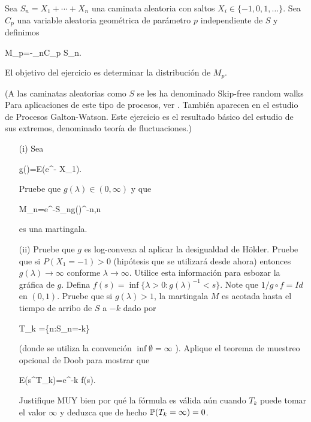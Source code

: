 \begin{problema}
		Sea $S_n=X_1+\cdots+X_n$ una caminata aleatoria con saltos $X_i\in \{-1,0,1,\ldots\}$. 
		Sea \(C_p\) una variable aleatoria geom\'etrica de par\'ametro $p$ independiente de \(S\) y definimos 
		
		\begin{esn}
			M_p=-\min_{n\leq C_p} S_n. 
		\end{esn}
		
		El objetivo del ejercicio es determinar la distribuci\'on de $M_p$.

		(A las caminatas aleatorias como $S$ se les ha denominado Skip-free random walks Para aplicaciones de este tipo 
		de procesos, ver \cite{MR1978607}. Tambi\'en aparecen en el estudio de Procesos Galton-Watson. 
		Este ejercicio es el resultado b\'asico del estudio de sus extremos, denominado teor\'ia de fluctuaciones.)

	\begin{enumerate}
		
		\item[(i)] 	
					Sea
					\begin{esn}
						g(\lambda)=E(e^{- \lambda X_1}).
					\end{esn} 
					Pruebe que $g(\lambda)\in (0,\infty)$ y que
					\begin{esn}
						M_n=e^{-\lambda S_n}g(\lambda)^{-n},n\geq 0
					\end{esn}
					es una martingala.
		\item[(ii)] 
					Pruebe que $g$ es log-convexa al aplicar la desigualdad de H\"older. Pruebe que si $P(X_1=-1)>0$ (hip\'otesis que se utilizar\'a desde ahora) 
					entonces $g(\lambda)\to\infty$ conforme $\lambda\to\infty$. Utilice esta informaci\'on para esbozar la gr\'afica de $g$. 
					Defina $ f(s)=\inf \{ \lambda>0:g(\lambda)^{-1} < s\} $. Note que $1/g\circ f=Id$ en $(0,1)$. Pruebe que si $g(\lambda)>1$, 
					la martingala $M$ es acotada hasta el tiempo de arribo de $S$ a $-k$ dado por 
					\begin{esn}
						T_k =\min \{n\in\na:S_n=-k\} 
					\end{esn}
					(donde se utiliza la convenci\'on $\inf\emptyset=\infty$ ). Aplique el teorema de muestreo opcional de Doob para mostrar que 
					\begin{esn}
						E(s^{T_k})=e^{-k f(s)}.
					\end{esn}
					Justifique MUY bien por qu\'e la f\'ormula es válida aún cuando $T_k$ puede tomar el valor $\infty$ y deduzca que de hecho $ \mathbb{P}  (T_k=\infty)=0$.
						

\end{enumerate}
\end{problema}
